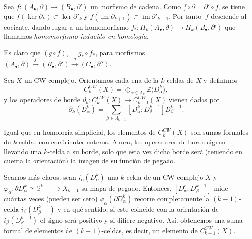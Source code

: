 \begin{definition}
    Sea $f \colon (A_\bullet, \partial) \to (B_\bullet, \partial')$ un morfismo de cadena. Como $f \circ \partial = \partial' \circ f$, se tiene que
    $f(\ker \partial_k) \subset \ker \partial'_k$ y $f(\operatorname{im} \partial_{k+1}) \subset \operatorname{im} \partial'_{k+1}$. Por tanto, \( f \) desciende al cociente, dando lugar a un homomorfismo $f_* \colon H_k(A_\bullet, \partial) \to H_k(B_\bullet, \partial')$ que llamamos \textit{homomorfismo inducido en homología}.

\end{definition}
\begin{remark}
    Es claro que $(g \circ f)_* = g_* \circ f_*$,
    para morfismos $(A_\bullet, \partial) \xrightarrow{f} (B_\bullet, \partial') \xrightarrow{g} (C_\bullet, \partial'')$.
\end{remark}

\bigskip

\begin{definition}
    Sea $X$ un CW-complejo. Orientamos cada una de la $k$-celdas de $X$ y definimos
    \begin{equation*}
        C^{CW}_k(X) = \oplus_{\alpha\in\Lambda_k} \mathbb{Z} \langle D^k_{\alpha}\rangle,
    \end{equation*}
    y los operadores de borde $\partial_k : C^{CW}_k(X) \to C^{CW}_{k-1}(X)$ vienen dados por 
    \begin{equation*}
        \partial_k(D^k_{\alpha}) = \sum_{\beta\in\Lambda_{k-1}}[D^k_{\alpha}:D^{k-1}_{\beta}]D^{k-1}_{\beta}.
    \end{equation*}
\end{definition}


Igual que en homología simplicial, los elementos de $C^{CW}_k(X)$ son sumas formales de $k$-celdas con coeficientes enteros. Ahora, los operadores de borde siguen llevando una $k$-celda a su borde, solo que esta vez dicho borde será (teniendo en cuenta la orientación) la imagen de su función de pegado. 

Seamos más claros: sean $i_{\alpha}(D^k_{\alpha})$ una $k$-celda de un CW-complejo $X$ y $\varphi_{\alpha}: \partial D_{\alpha}^k \simeq \mathbb{S}^{k-1} \to X_{k-1}$ su mapa de pegado. Entonces, $[D^k_{\alpha}:D^{k-1}_{\beta}]$ mide cuántas veces (pueden ser cero) $\varphi_{\alpha}(\partial D_{\alpha}^k)$ recorre completamente la $(k-1)$-celda $i_{\beta}(D^{k-1}_{\beta})$ y en qué sentido, si este coincide con la orientación de $i_{\beta}(D^{k-1}_{\beta})$ el signo será positivo y si difiere negativo. Así, obtenemos una suma formal de elementos de $(k-1)$-celdas, es decir, un elemento de $C^{CW}_{k-1}(X)$. 

